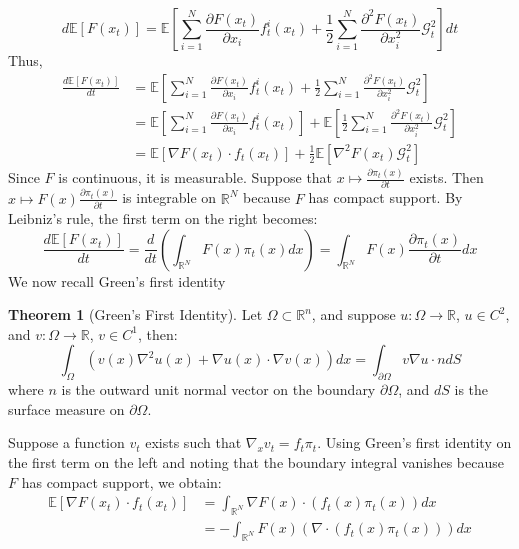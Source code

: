 \documentclass[a4paper,10pt]{article}
\theoremstyle{definition} %
\theoremstyle{definition} %
\theoremstyle{definition} %
\newtheorem{theorem}[definition]{Theorem}
\theoremstyle{definition} %
\newcommand{\0}{\boldsymbol{0}}
\begin{document}
\[
d\mathbb{E}[F(x_t)] = \mathbb{E}\left[\sum\limits_{i=1}^N \frac{\partial F(x_t)}{\partial x_i} f^i_t(x_t) + \frac{1}{2} \sum\limits_{i=1}^N \frac{\partial^2 F(x_t)}{\partial x_i^2} \mathcal{G}_t^2\right]dt
\]
Thus,
\begin{align}
    \frac{d\mathbb{E}[F(x_t)]}{dt} &= \mathbb{E}\left[\sum\limits_{i=1}^N \frac{\partial F(x_t)}{\partial x_i} f^i_t(x_t) + \frac{1}{2} \sum\limits_{i=1}^N  \frac{\partial^2 F(x_t)}{\partial x_i^2}\mathcal{G}_t^2\right] \nonumber \\
    &= \mathbb{E}\left[\sum\limits_{i=1}^N \frac{\partial F(x_t)}{\partial x_i} f^i_t(x_t)\right] + \mathbb{E}\left[\frac{1}{2} \sum\limits_{i=1}^N  \frac{\partial^2 F(x_t)}{\partial x_i^2} \mathcal{G}_t^2\right] \nonumber\\
    &= \mathbb{E}[ \nabla F(x_t) \cdot f_t(x_t)] + \frac{1}{2}\mathbb{E}[\nabla^2 F(x_t) \mathcal{G}_t^2] \label{eq:EsperanceEgality}
\end{align}
Since \( F \) is continuous, it is measurable. Suppose that \( x \mapsto \frac{\partial\pi_t(x)}{\partial t} \) exists. Then \( x \mapsto F(x)\frac{\partial\pi_t(x)}{\partial t} \) is integrable on \( \mathbb{R}^N \) because \( F \) has compact support. By Leibniz's rule, the first term on the right becomes:
\[
\frac{d\mathbb{E}[F(x_t)]}{dt} = \frac{d}{dt} \left(\int_{\mathbb{R}^N} F(x) \pi_t(x) dx\right) = \int_{\mathbb{R}^N}F(x)\frac{\partial\pi_t(x)}{\partial t} dx
\]
\vspace{2em}
We now recall Green’s first identity
\begin{theorem}[Green’s First Identity]
Let \( \Omega \subset \mathbb{R}^n \), and suppose \( u : \Omega \rightarrow \mathbb{R} \), \( u \in C^2 \), and \( v : \Omega \rightarrow \mathbb{R} \), \( v \in C^1 \), then:
\begin{equation}\label{eq:GreenId}
\int_\Omega (v(x)\nabla^2 u(x) + \nabla u(x) \cdot \nabla v(x)) dx = \int_{\partial\Omega} v \nabla u \cdot n dS
\end{equation}
where \( n \) is the outward unit normal vector on the boundary \( \partial\Omega \), and \( dS \) is the surface measure on \( \partial\Omega \).
\end{theorem}
Suppose a function \( v_t \) exists such that \( \nabla_x v_t = f_t \pi_t \).
Using Green’s first identity on the first term on the left and noting that the boundary integral vanishes because \( F \) has compact support, we obtain:
\begin{align*}
    \mathbb{E}[\nabla F(x_t)\cdot f_t(x_t)] &=\int_{\mathbb{R}^N} \nabla F(x)\cdot (f_t(x) \pi_t(x)) dx \\
    &= - \int_{\mathbb{R}^N}F(x) (\nabla \cdot (f_t(x)\pi_t(x))) dx
\end{align*}
\end{document}
